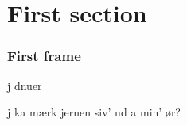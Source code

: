 \section{First section}

\begin{frame}
  \frametitle{First frame}
%
\begin{description}[short]
  \item[Dunno] j dnuer
  \item[dnu??] j ka mærk jernen siv' ud a min' ør?
\end{description}
%
\end{frame}
